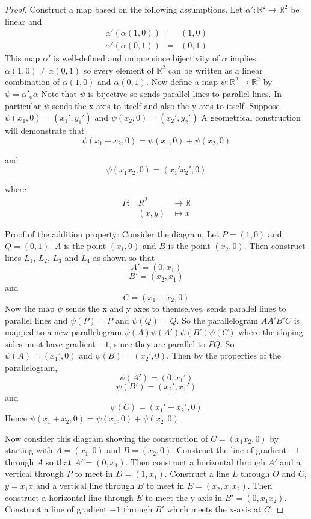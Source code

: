 \documentclass[honours]{UNSWthesis}
\newcommand{\R}{\mathbb{R}}
\newcommand{\1}{\mathbf{e}_{1}}
\newcommand{\2}{\mathbf{e}_{3}}
\newcommand{\3}{\mathbf{e}_{3}}
\begin{document}
\begin{proof}
Construct a map based on the following assumptions. Let $\alpha': \R^{2} \longrightarrow \R^{2}$ be linear and
\begin{eqnarray*}
\alpha'(\alpha(1,0))&=& (1,0)\\
\alpha'(\alpha(0,1)) &=& (0,1)
\end{eqnarray*}
This map $\alpha'$ is well-defined and unique since bijectivity of $\alpha$ implies $\alpha(1,0) \neq \alpha(0,1)$ so every element of $\R^{2}$ can be written as a linear combination of $\alpha(1,0)$ and $\alpha(0,1)$. 
Now define a map $\psi: \R^{2} \longrightarrow \R^{2}$ by $\psi= \alpha'_{o}\alpha$
Note that $\psi$ is bijective so sends parallel lines to parallel lines. In particular $\psi$ sends the x-axis to itself and also the y-axis to itself. Suppose $\psi(x_{1},0)=(x_{1}',y_{1}')$ and $\psi(x_{2},0)=(x_{2}',y_{2}')$
A geometrical construction will demonstrate that
\begin{equation}
\psi(x_{1}+x_{2},0)=\psi(x_{1},0)+\psi(x_{2},0)
\end{equation}

and 
\begin{equation}
\psi(x_{1}x_{2},0)=(x_{1}'x_{2}',0)
\end{equation}


where 
\begin{eqnarray*}
P: &R^{2}& \longrightarrow \R \\
&(x,y)& \longmapsto x
\end{eqnarray*}

Proof of the addition property:
Consider the diagram. Let $P=(1,0)$ and $Q=(0,1)$. $A$ is the point $(x_{1},0)$ and $B$ is the point $(x_{2},0)$. Then construct lines $L_{1}$, $L_{2}$, $L_{3}$ and $L_{4}$ as shown so that $$A'=(0,x_{1})$$ $$B'=(x_{2}, x_{1})$$ and $$C=(x_{1}+x_{2},0)$$ Now the map $\psi$ sends the x and y axes to themselves, sends parallel lines to parallel lines and $\psi(P)=P$ and $\psi(Q)=Q$. So the parallelogram $AA'B'C$ is mapped to a new parallelogram $\psi(A)\psi(A')\psi(B')\psi(C)$ where the sloping sides must have gradient $-1$, since they are parallel to $PQ$. So $\psi(A)=(x_{1}',0)$ and $\psi(B)=(x_{2}',0)$. Then by the properties of the parallelogram, 
\[
\psi(A')=(0,x_{1}')
\]
\[
\psi(B')=(x_{2}',x_{1}')
\]
and 
\[
\psi(C)=(x_{1}'+x_{2}',0)
\]
Hence $\psi(x_{1}+x_{2},0)=\psi(x_{1},0)+\psi(x_{2},0)$.

Now consider this diagram showing the construction of $C=(x_{1}x_{2},0)$ by starting with $A=(x_{1},0)$ and $B=(x_{2},0)$. Construct the line of gradient $-1$ through $A$ so that $A'=(0,x_{1})$. Then construct a horizontal through $A'$ and a vertical through $P$ to meet in $D=(1,x_{1})$. Construct a line $L$ through $O$ and $C$, $y=x_{1}x$ and a vertical line through $B$ to meet in $E=(x_{2}, x_{1}x_{2})$. Then construct a horizontal line through $E$ to meet the y-axis in $B'=(0,x_{1}x_{2})$. Construct a line of gradient $-1$ through $B'$ which meets the x-axis at $C$. 


\end{proof}
\end{document}
